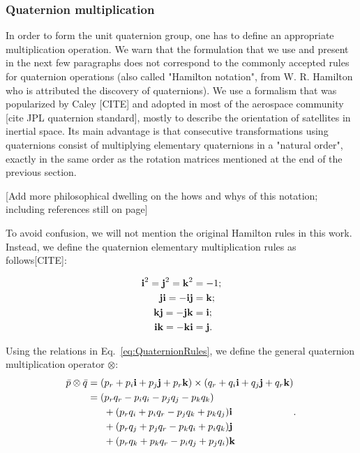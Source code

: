 \subsubsection{Quaternion multiplication}

In order to form the unit quaternion group, one has to define an appropriate multiplication operation. We warn that the formulation that we use and present in the next few paragraphs does not correspond to the commonly accepted rules for quaternion operations (also called "Hamilton notation", from W. R. Hamilton who is attributed the discovery of quaternions). We use a formalism that was popularized by Caley [CITE] and adopted in most of the aerospace community [cite JPL quaternion standard], mostly to describe the orientation of satellites in inertial space. Its main advantage is that consecutive transformations using quaternions consist of multiplying elementary quaternions in a "natural order", exactly in the same order as the rotation matrices mentioned at the end of the previous section. 

[Add more philosophical dwelling on the hows and whys of this notation; including references still on page]

To avoid confusion, we will not mention the original Hamilton rules in this work. Instead, we define the quaternion elementary multiplication rules as follows[CITE]:

\begin{equation}
\label{eq:QuaternionRules}
\begin{split}
 \textrm{\textbf{i}}^2 = \textrm{\textbf{j}}^2 = \textrm{\textbf{k}}^2 &= -1;\\
 \textrm{\textbf{j}}\textrm{\textbf{i}} = -\textrm{\textbf{i}}\textrm{\textbf{j}} &= \textrm{\textbf{k}};\\
 \textrm{\textbf{k}}\textrm{\textbf{j}} = -\textrm{\textbf{j}}\textrm{\textbf{k}} &= \textrm{\textbf{i}};\\
 \textrm{\textbf{i}}\textrm{\textbf{k}} = -\textrm{\textbf{k}}\textrm{\textbf{i}} &= \textrm{\textbf{j}}.
\end{split}
\end{equation}

Using the relations in Eq.~\ref{eq:QuaternionRules}, we define the general quaternion multiplication operator $\otimes$:
\begin{equation}
\begin{split}
\bar{p}\otimes\bar{q} & =  (p_r + p_i\textrm{\textbf{i}} + p_j\textrm{\textbf{j}} + p_r\textrm{\textbf{k}})\times(q_r + q_i\textrm{\textbf{i}} + q_j\textrm{\textbf{j}} + q_r\textrm{\textbf{k}}) \\
& =  (p_rq_r - p_iq_i - p_jq_j- p_kq_k)\\
& \;\;\;\;\;\; +  (p_rq_i + p_iq_r - p_jq_k + p_kq_j)\textrm{\textbf{i}}\\
& \;\;\;\;\;\; +  (p_rq_j + p_jq_r - p_kq_i + p_iq_k)\textrm{\textbf{j}}\\
& \;\;\;\;\;\; +  (p_rq_k + p_kq_r - p_iq_j + p_jq_i)\textrm{\textbf{k}}\\
\end{split}.
\end{equation}

